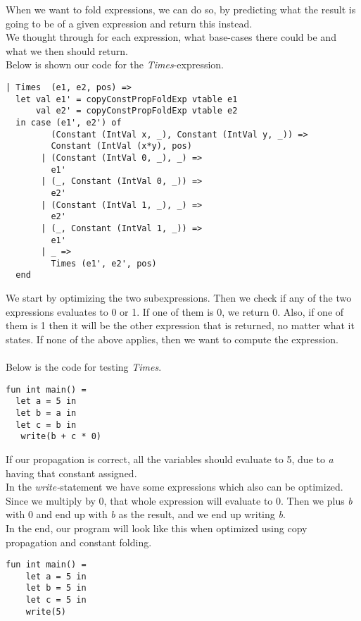\documentclass[paper=a4, fontsize=11pt]{scrartcl} %
\numberwithin{equation}{section} %
\numberwithin{figure}{section} %
\numberwithin{table}{section} %
\begin{document}
When we want to fold expressions, we can do so, by predicting what the result is going to be of a given expression and return this instead.\\
We thought through for each expression, what base-cases there could be and what we then should return.\\

Below is shown our code for the \textit{Times}-expression. 
\begin{lstlisting}
| Times  (e1, e2, pos) =>
  let val e1' = copyConstPropFoldExp vtable e1
      val e2' = copyConstPropFoldExp vtable e2
  in case (e1', e2') of
         (Constant (IntVal x, _), Constant (IntVal y, _)) =>
         Constant (IntVal (x*y), pos)
       | (Constant (IntVal 0, _), _) =>
         e1'
       | (_, Constant (IntVal 0, _)) =>
         e2'
       | (Constant (IntVal 1, _), _) =>
         e2'
       | (_, Constant (IntVal 1, _)) =>
         e1'
       | _ =>
         Times (e1', e2', pos)
  end
\end{lstlisting}

We start by optimizing the two subexpressions. Then we check if any of the two expressions evaluates to 0 or 1. If one of them is 0, we return 0. Also, if one of them is 1 then it will be the other expression that is returned, no matter what it states. If none of the above applies, then we want to compute the expression.\\\\
Below is the code for testing \textit{Times}. 
\begin{lstlisting}
fun int main() = 
  let a = 5 in
  let b = a in
  let c = b in
   write(b + c * 0)
\end{lstlisting}
If our propagation is correct, all the variables should evaluate to 5, due to \textit{a} having that constant assigned.\\
In the \textit{write-}statement we have some expressions which also can be optimized. Since we multiply by 0, that whole expression will evaluate to 0. Then we plus \textit{b} with 0 and end up with \textit{b} as the result, and we end up writing \textit{b}.\\
In the end, our program will look like this when optimized using copy propagation and constant folding.
\begin{lstlisting}
fun int main() =  
    let a = 5 in    
    let b = 5 in    
    let c = 5 in
    write(5)
\end{lstlisting}

\pagebreak
\end{document}
